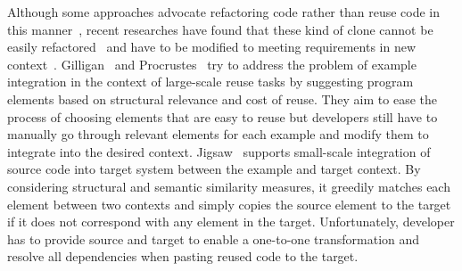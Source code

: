 \documentclass{sig-alternate}
\begin{document}
Although some approaches advocate refactoring code rather than reuse code in this manner~\cite{fowler:refactoring}, recent researches have found that these kind of clone cannot be easily refactored~\cite{Kim:cloneGenealogy05} and have to be modified to meeting requirements in new context~\cite{Selby:largeReuse05}. Gilligan~\cite{Holmes:reuse07} and Procrustes~\cite{Holmes:ASE09} try to address the problem of example integration in the context of large-scale reuse tasks by suggesting program elements  based on structural relevance and cost of reuse. They aim to ease the process of choosing elements that are easy to reuse but developers still have to manually go through relevant elements for each example and modify them to integrate into the desired context. Jigsaw~\cite{Cottrell:jigsaw08} supports small-scale integration of source code into target system  between the example and target context. By considering structural and semantic similarity measures, it greedily matches each element between two contexts and simply copies the source element to the target if it does not correspond with any element in the target. Unfortunately, developer has to provide source and target to enable a one-to-one transformation and resolve all dependencies when pasting reused code to the target.  









\end{document}
